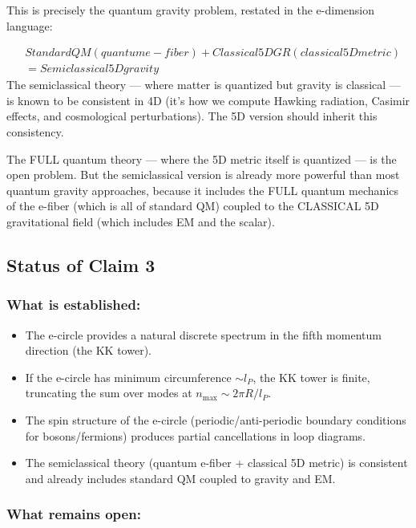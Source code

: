\documentclass[aps,prd,preprint,superscriptaddress,longbibliography,floatfix]{revtex4-2}
\theoremstyle{remark}
\begin{document}
This is precisely the quantum gravity problem, restated in the e-dimension language:


\begin{align}
    & Standard QM (quantum e-fiber) + Classical 5D GR (classical 5D metric) \\
    & = Semiclassical 5D gravity
\end{align}
The semiclassical theory --- where matter is quantized but gravity is classical --- is known to be consistent in 4D (it's how we compute Hawking radiation, Casimir effects, and cosmological perturbations). The 5D version should inherit this consistency.

The FULL quantum theory --- where the 5D metric itself is quantized --- is the open problem. But the semiclassical version is already more powerful than most quantum gravity approaches, because it includes the FULL quantum mechanics of the e-fiber (which is all of standard QM) coupled to the CLASSICAL 5D gravitational field (which includes EM and the scalar).



\subsection{Status of Claim 3}


\subsubsection{What is established:}


\begin{itemize}
  \item The e-circle provides a natural discrete spectrum in the fifth momentum direction (the KK tower).
  \item If the e-circle has minimum circumference $\sim l_P$, the KK tower is finite, truncating the sum over modes at $n_{\max} \sim  2\pi R/l_P$.
  \item The spin structure of the e-circle (periodic/anti-periodic boundary conditions for bosons/fermions) produces partial cancellations in loop diagrams.
  \item The semiclassical theory (quantum e-fiber + classical 5D metric) is consistent and already includes standard QM coupled to gravity and EM.
\end{itemize}


\subsubsection{What remains open:}
\end{document}
